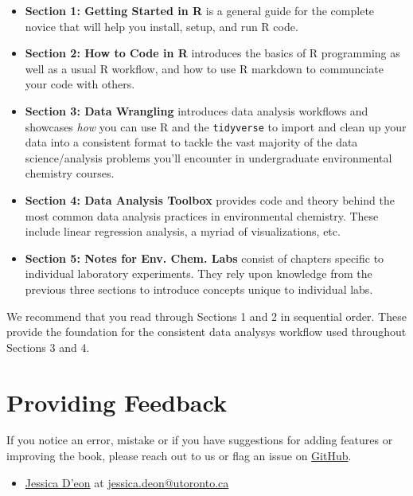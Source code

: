 \documentclass[
]{book}
\providecommand{\tightlist}{%
  \setlength{\itemsep}{0pt}\setlength{\parskip}{0pt}}
\begin{document}
\begin{itemize}
\tightlist
\item
  \textbf{Section 1: Getting Started in R} is a general guide for the complete novice that will help you install, setup, and run R code.
\item
  \textbf{Section 2: How to Code in R} introduces the basics of R programming as well as a usual R workflow, and how to use R markdown to communciate your code with others.
\item
  \textbf{Section 3: Data Wrangling} introduces data analysis workflows and showcases \emph{how} you can use R and the \texttt{tidyverse} to import and clean up your data into a consistent format to tackle the vast majority of the data science/analysis problems you'll encounter in undergraduate environmental chemistry courses.
\item
  \textbf{Section 4: Data Analysis Toolbox} provides code and theory behind the most common data analysis practices in environmental chemistry. These include linear regression analysis, a myriad of visualizations, etc.
\item
  \textbf{Section 5: Notes for Env. Chem. Labs} consist of chapters specific to individual laboratory experiments. They rely upon knowledge from the previous three sections to introduce concepts unique to individual labs.
\end{itemize}

We recommend that you read through Sections 1 and 2 in sequential order. These provide the foundation for the consistent data analysys workflow used throughout Sections 3 and 4.

\hypertarget{providing-feedback}{%
\section*{Providing Feedback}\label{providing-feedback}}

If you notice an error, mistake or if you have suggestions for adding features or improving the book, please reach out to us or flag an issue on \href{https://github.com/UofTChem-Teaching/R4EnvChem/issues}{GitHub}.

\begin{itemize}
\tightlist
\item
  \href{https://www.chemistry.utoronto.ca/people/directories/all-faculty/jessica-deon}{Jessica D'eon} at \url{jessica.deon@utoronto.ca}
\end{itemize}
\end{document}
